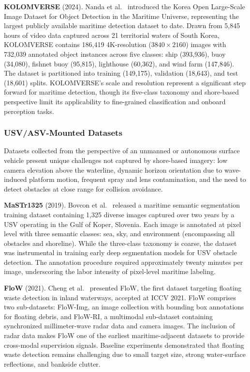 \textbf{KOLOMVERSE} (2024). Nanda et al.~\cite{Nanda2024KOLOMVERSE} introduced the
Korea Open Large-Scale Image Dataset for Object Detection in the Maritime Universe,
representing the largest publicly available maritime detection dataset to date. Drawn
from 5,845 hours of video data captured across 21 territorial waters of South Korea,
KOLOMVERSE contains 186,419 4K-resolution ($3840 \times 2160$) images with 732,039
annotated object instances across five classes: ship (393,936), buoy (34,080), fishnet
buoy (95,815), lighthouse (60,362), and wind farm (147,846). The dataset is partitioned
into training (149,175), validation (18,643), and test (18,601) splits. KOLOMVERSE's
scale and resolution represent a significant step forward for maritime detection,
though its five-class taxonomy and shore-based perspective limit its applicability to
fine-grained classification and onboard perception tasks.

\subsubsection{USV/ASV-Mounted Datasets}
\label{subsubsec:usv_mounted}

Datasets collected from the perspective of an unmanned or autonomous surface vehicle
present unique challenges not captured by shore-based imagery: low camera elevation
above the waterline, dynamic horizon orientation due to wave-induced platform motion,
frequent spray and lens contamination, and the need to detect obstacles at close range
for collision avoidance.

\textbf{MaSTr1325} (2019). Bovcon et al.~\cite{Bovcon2019MaSTr1325} released a maritime
semantic segmentation training dataset containing 1,325 diverse images captured over two
years by a USV operating in the Gulf of Koper, Slovenia. Each image is annotated at
pixel level with three semantic classes: sea, sky, and environment (encompassing all
obstacles and shoreline). While the three-class taxonomy is coarse, the dataset was
instrumental in training early deep segmentation models for USV obstacle detection. The
annotation procedure required approximately twenty minutes per image, underscoring the
labor intensity of pixel-level maritime labeling.

\textbf{FloW} (2021). Cheng et al.~\cite{Cheng2021FloW} presented FloW, the first
dataset targeting floating waste detection in inland waterways, accepted at ICCV 2021.
FloW comprises two sub-datasets: FloW-Img, an image collection with bounding box
annotations for floating debris, and FloW-RI, a multimodal sub-dataset containing
synchronized millimeter-wave radar data and camera images. The inclusion of radar data
makes FloW one of the earliest maritime-adjacent datasets to provide cross-modal
supervision signals. Baseline experiments demonstrated that floating waste detection
remains challenging due to small target size, strong water-surface reflections, and
bankside clutter.

